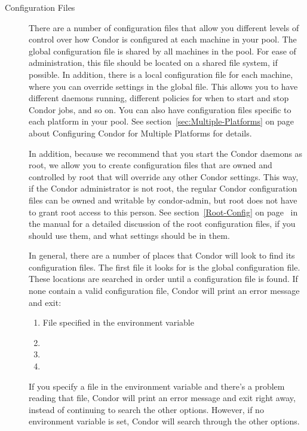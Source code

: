 \begin{description}
\begin{description}
\item[Configuration Files] There are a number of configuration files
that allow you
different levels of control over how Condor is configured at each
machine in your pool.  
The global configuration file is shared by all machines in the pool.
For ease of administration, this file should be located on a shared
file system, if possible.
In addition, there is a local
configuration file for each machine, where you can override settings in the
global file.  This allows you to have different daemons running,
different policies for when to start and stop Condor jobs, and so on.
You can also have configuration files specific to each platform in your pool.
See
section~\ref{sec:Multiple-Platforms} on
page~\pageref{sec:Multiple-Platforms} about Configuring Condor for
Multiple Platforms for details.

In addition, because we recommend that you start the Condor daemons as
root, we allow you to create configuration files that are owned and
controlled by root that will override any other Condor settings.  This
way, if the Condor administrator is not root, the regular Condor configuration
files can be owned and writable by condor-admin, but root does not have
to grant root access to this person.  See
section~\ref{Root-Config} on page~\pageref{Root-Config} in the
manual for a detailed discussion of the root configuration files, if you
should use them, and what settings should be in them.

In general, there are a number of places that Condor will look to find
its configuration files.  The first file it looks for is the global configuration
file.  These locations are searched in order until a configuration file is
found.  If none contain a valid configuration file, Condor will print an
error message and exit:
\begin{enumerate}
   \item File specified in the  environment variable
   \item {}
   \item {}
   \item {}
\end{enumerate}

If you specify a file in the  environment variable
and there's a problem reading that file, Condor will print an error
message and exit right away, instead of continuing to search the other
options.
However, if no  environment variable is set,
Condor will search through the other options.


\end{description}
\end{description}
